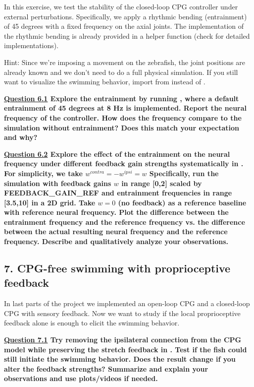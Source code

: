 \documentclass{cmc}
\begin{document}
In this exercise, we test the stability of the closed-loop CPG controller under external perturbations. Specifically, we apply a rhythmic bending (entrainment) of 45 degrees with a fixed frequency on the axial joints. The implementation of the rhythmic bending is already provided in a helper function  (check  for detailed implementations).

Hint: Since we're imposing a movement on the zebrafish, the joint positions are already known and we don't need to do a full physical simulation.
If you still want to visualize the swimming behavior, import  from  instead of .

\textbf{\underline{Question 6.1} Explore the entrainment by running , where a default entrainment of 45 degrees at 8 Hz is implemented. Report the neural frequency of the controller. How does the frequency compare to the simulation without entrainment? Does this match your expectation and why?}

\textbf{\underline{Question 6.2} Explore the effect of the entrainment on the neural frequency under different feedback gain strengths systematically in . For simplicity, we take $w^{contra} = -w^{ipsi} = w$
Specifically, run the simulation with feedback gains $w$ in range [0,2] scaled by FEEDBACK\_GAIN\_REF and entrainment frequencies in range [3.5,10] in a 2D grid. Take $w=0$ (no feedback) as a reference baseline with reference neural frequency. Plot the difference between the entrainment frequency and the reference frequency vs. the difference between the actual resulting neural frequency and the reference frequency. Describe and qualitatively analyze your observations.}



\subsection*{7. CPG-free swimming with proprioceptive feedback}

In last parts of the project we implemented an open-loop CPG and a closed-loop CPG with sensory feedback. Now we want to study if the local proprioceptive feedback alone is enough to elicit the swimming behavior.

\textbf{\underline{Question 7.1} Try removing the ipsilateral connection from the CPG model while preserving the stretch feedback in . Test if the fish could still initiate the swimming behavior. Does the result change if you alter the feedback strengths? Summarize and explain your observations and use plots/videos if needed.}
\end{document}

